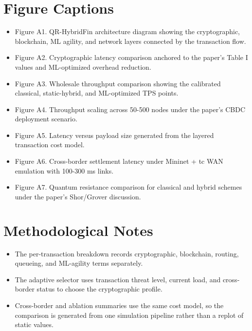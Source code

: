\documentclass[11pt]{article}
\begin{document}
\section*{Figure Captions}
\begin{itemize}
\item Figure A1. QR-HybridFin architecture diagram showing the cryptographic, blockchain, ML agility, and network layers connected by the transaction flow.
\item Figure A2. Cryptographic latency comparison anchored to the paper's Table I values and ML-optimized overhead reduction.
\item Figure A3. Wholesale throughput comparison showing the calibrated classical, static-hybrid, and ML-optimized TPS points.
\item Figure A4. Throughput scaling across 50-500 nodes under the paper's CBDC deployment scenario.
\item Figure A5. Latency versus payload size generated from the layered transaction cost model.
\item Figure A6. Cross-border settlement latency under Mininet + tc WAN emulation with 100-300 ms links.
\item Figure A7. Quantum resistance comparison for classical and hybrid schemes under the paper's Shor/Grover discussion.
\end{itemize}
\section*{Methodological Notes}
\begin{itemize}
\item The per-transaction breakdown records cryptographic, blockchain, routing, queueing, and ML-agility terms separately.
\item The adaptive selector uses transaction threat level, current load, and cross-border status to choose the cryptographic profile.
\item Cross-border and ablation summaries use the same cost model, so the comparison is generated from one simulation pipeline rather than a replot of static values.
\end{itemize}
\end{document}
